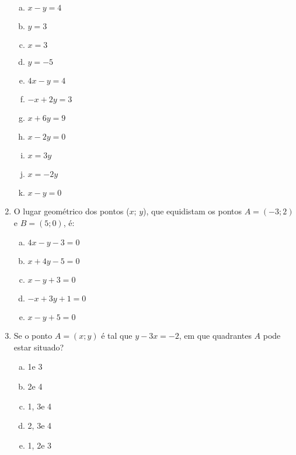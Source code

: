 \documentclass[a4paper,14pt]{article}
\begin{document}
\begin{multicols}{2}
\begin{enumerate}
\begin{enumerate}[a)]
            	\item $x - y = 4$
            	\item $y = 3$
            	\item $x = 3$
            	\item $y = -5$
            	\item $4x - y = 4$
            	\item $-x + 2y = 3$
            	\item $x + 6y = 9$
            	\item $x - 2y = 0$
            	\item $x = 3y$
            	\item $x = -2y$
            	\item $x - y = 0$
            \end{enumerate}
            \item O lugar geométrico dos pontos ($x$; $y$), que equidistam os pontos $A = (-3; 2)$ e $B = (5; 0)$, é:
            \begin{enumerate}[a)]
            	\item $4x - y - 3 = 0$
            	\item $x + 4y - 5 = 0$
            	\item $x - y + 3 = 0$
            	\item $-x + 3y + 1 = 0$
            	\item $x - y + 5 = 0$
            \end{enumerate}
            \item Se o ponto $A = (x; y)$ é tal que $y - 3x = -2$, em que quadrantes $A$ pode estar situado?
            \begin{enumerate}[a)]
            	\item 1\textordmasculine{~}e 3\textordmasculine{~}
            	\item 2\textordmasculine{~}e 4\textordmasculine{~}
            	\item 1\textordmasculine{}, 3\textordmasculine{~}e 4\textordmasculine{~}
            	\item 2\textordmasculine{}, 3\textordmasculine{~}e 4\textordmasculine{~}
            	\item 1\textordmasculine{}, 2\textordmasculine{~}e 3\textordmasculine{~}
            \end{enumerate}
            	
        \end{enumerate}
    $~$ \\ $~$ \\ $~$ \\ $~$ \\ $~$ \\
    \end{multicols}
\end{document}
